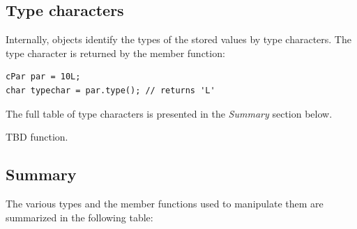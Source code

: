 \subsection{Type characters}

Internally,  objects identify the types of the stored values 
by type characters. The type character is returned by the  
member function:

\begin{Verbatim}
cPar par = 10L;
char typechar = par.type(); // returns 'L'
\end{Verbatim}


The full table of type characters is presented in the \textit{Summary} 
section below.

TBD  function.





\subsection{Summary}

The various  types and the member functions used to manipulate them are summarized
in the following table:

